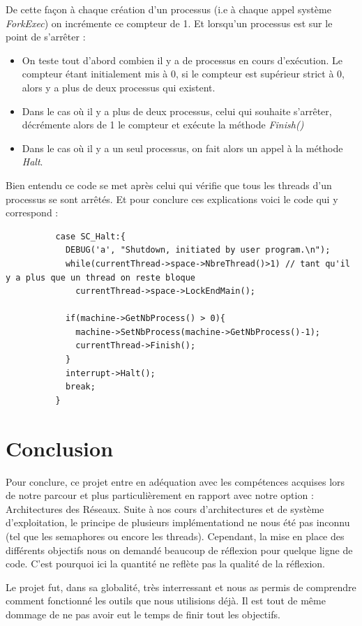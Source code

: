 \documentclass[a4paper,10pt]{report}
\begin{document}
  De cette façon à chaque création d'un processus (i.e à chaque appel système \emph{ForkExec}) on incrémente ce compteur de 1. Et lorsqu'un processus est 
  sur le point de s'arrêter : 
  \begin{itemize}
   \item On teste tout d'abord combien il y a de processus en cours d'exécution. Le compteur étant initialement mis à 0, si le compteur est supérieur 
   strict à 0, alors y a plus de deux processus qui existent.
   \item Dans le cas où il y a plus de deux processus, celui qui souhaite s'arrêter, décrémente alors de 1 le compteur et exécute la méthode \emph{Finish()}
   \item Dans le cas où il y a un seul processus, on fait alors un appel à la méthode \emph{Halt}.
  \end{itemize}
  Bien entendu ce code se met après celui qui vérifie que tous les threads d'un processus se sont arrêtés. Et pour conclure ces explications
  voici le code qui y correspond :
  \begin{lstlisting}
          case SC_Halt:{
            DEBUG('a', "Shutdown, initiated by user program.\n");
            while(currentThread->space->NbreThread()>1) // tant qu'il y a plus que un thread on reste bloque
              currentThread->space->LockEndMain();
            
            if(machine->GetNbProcess() > 0){
              machine->SetNbProcess(machine->GetNbProcess()-1);
              currentThread->Finish();
            }
            interrupt->Halt();
            break;
          }   
  \end{lstlisting}
  \part{Conclusion}
    Pour conclure, ce projet entre en adéquation avec les compétences acquises lors de notre parcour et plus particulièrement en rapport avec notre option :
  Architectures des Réseaux. Suite à nos cours d'architectures et de système d'exploitation, le principe de plusieurs implémentationd ne nous été pas inconnu (tel
  que les semaphores ou encore les threads). Cependant, la mise en place des différents objectifs nous on demandé beaucoup de réflexion pour quelque ligne de code.
  C'est pourquoi ici la quantité ne reflète pas la qualité de la réflexion.
  
    Le projet fut, dans sa globalité, très interressant et nous as permis de comprendre comment fonctionné les outils que nous utilisions déjà. 
    Il est tout de même dommage de ne pas avoir eut le temps de finir tout les objectifs.
\end{document}
